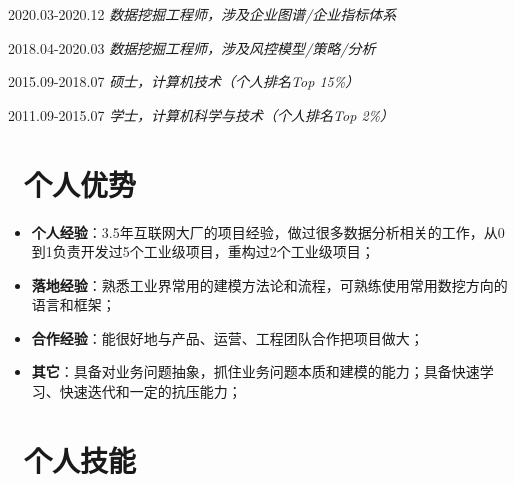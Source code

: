 \documentclass{resume}
\begin{document}
                                  {2020.03-2020.12}
   \faUserMd   \textit{   数据挖掘工程师，涉及企业图谱/企业指标体系 }

         {2018.04-2020.03}
   \faUserMd   \textit{   数据挖掘工程师，涉及风控模型/策略/分析 }

                                              {2015.09-2018.07}
   \faGraduationCap   \textit{  硕士，计算机技术（个人排名Top 15\%） }

                                  {2011.09-2015.07}
   \faGraduationCap   \textit{  学士，计算机科学与技术（个人排名Top 2\%）}

\medskip










\section{   \faCogs    \  个人优势}

\begin{itemize}  [parsep=0.8ex]
   \item  \textbf{个人经验}：3.5年互联网大厂的项目经验，做过很多数据分析相关的工作，从0到1负责开发过5个工业级项目，重构过2个工业级项目；

   \item   \textbf{落地经验}：熟悉工业界常用的建模方法论和流程，可熟练使用常用数挖方向的语言和框架；
   
   \item    \textbf{合作经验}：能很好地与产品、运营、工程团队合作把项目做大；
   
  \item  \textbf{其它}：具备对业务问题抽象，抓住业务问题本质和建模的能力；具备快速学习、快速迭代和一定的抗压能力；
 
\end{itemize}

\medskip








\section{   \faCogs    \  个人技能}
\end{document}
